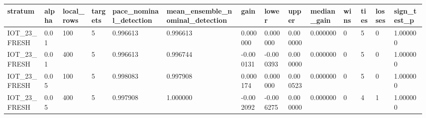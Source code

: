 \begin{tabular}{llllllllllllll}
\toprule
stratum & alpha & local\_rows & targets & pace\_nominal\_detection & mean\_ensemble\_nominal\_detection & gain & lower & upper & median\_gain & wins & ties & losses & sign\_test\_p \\
\midrule
IOT\_23\_FRESH & 0.01 & 100 & 5 & 0.996613 & 0.996613 & 0.000000 & 0.000000 & 0.000000 & 0.000000 & 0 & 5 & 0 & 1.000000 \\
IOT\_23\_FRESH & 0.01 & 400 & 5 & 0.996613 & 0.996744 & -0.000131 & -0.000393 & 0.000000 & 0.000000 & 0 & 5 & 0 & 1.000000 \\
IOT\_23\_FRESH & 0.05 & 100 & 5 & 0.998083 & 0.997908 & 0.000174 & 0.000000 & 0.000523 & 0.000000 & 0 & 5 & 0 & 1.000000 \\
IOT\_23\_FRESH & 0.05 & 400 & 5 & 0.997908 & 1.000000 & -0.002092 & -0.006275 & 0.000000 & 0.000000 & 0 & 4 & 1 & 1.000000 \\
\bottomrule
\end{tabular}
